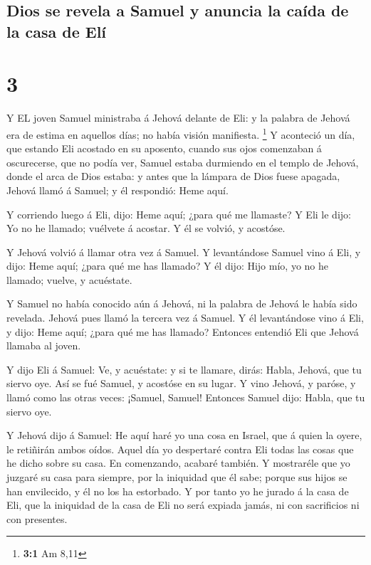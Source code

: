 \hypertarget{dios-se-revela-a-samuel-y-anuncia-la-cauxedda-de-la-casa-de-eluxed}{%
\subsection{Dios se revela a Samuel y anuncia la caída de la casa de
Elí}\label{dios-se-revela-a-samuel-y-anuncia-la-cauxedda-de-la-casa-de-eluxed}}

\hypertarget{section-2}{%
\section{3}\label{section-2}}

 Y EL joven Samuel ministraba á Jehová delante de Eli: y la
palabra de Jehová era de estima en aquellos días; no había visión
manifiesta. \footnote{\textbf{3:1} Am 8,11}  Y aconteció un
día, que estando Eli acostado en su aposento, cuando sus ojos comenzaban
á oscurecerse, que no podía ver,  Samuel estaba durmiendo en
el templo de Jehová, donde el arca de Dios estaba: y antes que la
lámpara de Dios fuese apagada,  Jehová llamó á Samuel; y él
respondió: Heme aquí.

 Y corriendo luego á Eli, dijo: Heme aquí; ¿para qué me
llamaste? Y Eli le dijo: Yo no he llamado; vuélvete á acostar. Y él se
volvió, y acostóse.

 Y Jehová volvió á llamar otra vez á Samuel. Y levantándose
Samuel vino á Eli, y dijo: Heme aquí; ¿para qué me has llamado? Y él
dijo: Hijo mío, yo no he llamado; vuelve, y acuéstate.

 Y Samuel no había conocido aún á Jehová, ni la palabra de
Jehová le había sido revelada.  Jehová pues llamó la tercera
vez á Samuel. Y él levantándose vino á Eli, y dijo: Heme aquí; ¿para qué
me has llamado? Entonces entendió Eli que Jehová llamaba al joven.

 Y dijo Eli á Samuel: Ve, y acuéstate: y si te llamare,
dirás: Habla, Jehová, que tu siervo oye. Así se fué Samuel, y acostóse
en su lugar.  Y vino Jehová, y paróse, y llamó como las
otras veces: ¡Samuel, Samuel! Entonces Samuel dijo: Habla, que tu siervo
oye.

 Y Jehová dijo á Samuel: He aquí haré yo una cosa en
Israel, que á quien la oyere, le retiñirán ambos oídos. 
Aquel día yo despertaré contra Eli todas las cosas que he dicho sobre su
casa. En comenzando, acabaré también.  Y mostraréle que yo
juzgaré su casa para siempre, por la iniquidad que él sabe; porque sus
hijos se han envilecido, y él no los ha estorbado.  Y por
tanto yo he jurado á la casa de Eli, que la iniquidad de la casa de Eli
no será expiada jamás, ni con sacrificios ni con presentes.


